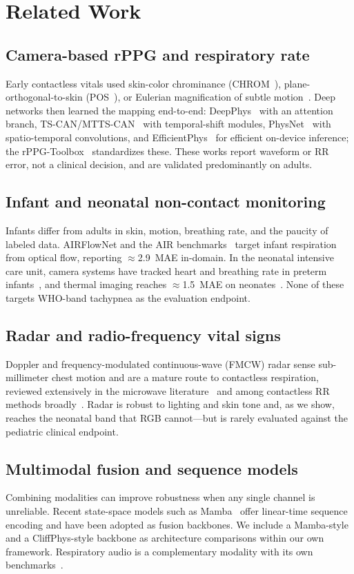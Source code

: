 \documentclass[journal]{IEEEtran}
\begin{document}
\section{Related Work}
\subsection{Camera-based rPPG and respiratory rate}
Early contactless vitals used skin-color chrominance (CHROM~\cite{chrom_dehaan}), plane-orthogonal-to-skin
(POS~\cite{pos_wang}), or Eulerian magnification of subtle motion~\cite{evm_wu}. Deep networks then
learned the mapping end-to-end: DeepPhys~\cite{mcduff_deepphys} with an attention branch,
TS-CAN/MTTS-CAN~\cite{liu_mttscan} with temporal-shift modules, PhysNet~\cite{yu_physnet} with
spatio-temporal convolutions, and EfficientPhys~\cite{liu_efficientphys} for efficient on-device
inference; the rPPG-Toolbox~\cite{liu_rppgtoolbox} standardizes these. These works report waveform or RR
error, not a clinical decision, and are validated predominantly on adults.

\subsection{Infant and neonatal non-contact monitoring}
Infants differ from adults in skin, motion, breathing rate, and the paucity of labeled data. AIRFlowNet
and the AIR benchmarks~\cite{infant_air} target infant respiration from optical flow, reporting
$\approx$2.9~MAE in-domain. In the neonatal intensive care unit, camera systems have tracked heart and
breathing rate in preterm infants~\cite{villarroel_npj}, and thermal imaging reaches $\approx$1.5~MAE on
neonates~\cite{pereira_thermal}. None of these targets WHO-band tachypnea as the evaluation endpoint.

\subsection{Radar and radio-frequency vital signs}
Doppler and frequency-modulated continuous-wave (FMCW) radar sense sub-millimeter chest motion and are a
mature route to contactless respiration, reviewed extensively in the microwave
literature~\cite{li_radar_tmtt} and among contactless RR methods broadly~\cite{massaroni_review}. Radar
is robust to lighting and skin tone and, as we show, reaches the neonatal band that RGB cannot---but is
rarely evaluated against the pediatric clinical endpoint.

\subsection{Multimodal fusion and sequence models}
Combining modalities can improve robustness when any single channel is unreliable. Recent state-space
models such as Mamba~\cite{mamba_gu} offer linear-time sequence encoding and have been adopted as fusion
backbones. We include a Mamba-style and a CliffPhys-style backbone as architecture comparisons within our
own framework. Respiratory audio is a complementary modality with its own benchmarks~\cite{icbhi_rocha}.
\end{document}
